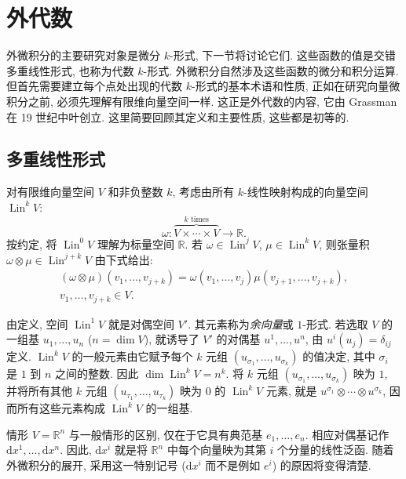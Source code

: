 \section{外代数}\label{sec:exterior-algebra}

外微积分的主要研究对象是微分 $k$-形式, 下一节将讨论它们. 这些函数的值是交错多重线性形式, 也称为代数 $k$-形式. 外微积分自然涉及这些函数的微分和积分运算. 但首先需要建立每个点处出现的代数 $k$-形式的基本术语和性质, 正如在研究向量微积分之前, 必须先理解有限维向量空间一样. 这正是外代数的内容, 它由 Grassman 在 19 世纪中叶创立. 这里简要回顾其定义和主要性质, 这些都是初等的.

\subsection{多重线性形式}\label{subsec:multilinear-forms}

对有限维向量空间 $V$ 和非负整数 $k$, 考虑由所有 $k$-线性映射构成的向量空间 $\operatorname{Lin}^kV$:
\[
\omega:\overbrace{V\times\cdots\times V}^{k\text{ times}}\to\mathbb R.
\]
按约定, 将 $\operatorname{Lin}^0V$ 理解为标量空间 $\mathbb R$. 若 $\omega\in\operatorname{Lin}^jV$, $\mu\in\operatorname{Lin}^kV$, 则张量积 $\omega\otimes\mu\in\operatorname{Lin}^{j+k}V$ 由下式给出:
\[
\begin{gathered}
(\omega\otimes\mu)(v_1,\ldots,v_{j+k})=\omega(v_1,\ldots,v_j)\mu(v_{j+1},\ldots,v_{j+k}),\\
v_1,\ldots,v_{j+k}\in V.
\end{gathered}
\]

由定义, 空间 $\operatorname{Lin}^1V$ 就是对偶空间 $V'$. 其元素称为\emph{余向量}或 $1$-形式. 若选取 $V$ 的一组基 $u_1,\ldots,u_n$ ($n=\dim V$), 就诱导了 $V'$ 的对偶基 $u^1,\ldots,u^n$, 由 $u^i(u_j)=\delta_{ij}$ 定义. $\operatorname{Lin}^kV$ 的一般元素由它赋予每个 $k$ 元组 $(u_{\sigma_1},\ldots,u_{\sigma_k})$ 的值决定, 其中 $\sigma_i$ 是 $1$ 到 $n$ 之间的整数. 因此 $\dim\operatorname{Lin}^kV=n^k$. 将 $k$ 元组 $(u_{\sigma_1},\ldots,u_{\sigma_k})$ 映为 $1$, 并将所有其他 $k$ 元组 $(u_{\tau_1},\ldots,u_{\tau_k})$ 映为 $0$ 的 $\operatorname{Lin}^kV$ 元素, 就是 $u^{\sigma_1}\otimes\cdots\otimes u^{\sigma_k}$, 因而所有这些元素构成 $\operatorname{Lin}^kV$ 的一组基.

情形 $V=\mathbb R^n$ 与一般情形的区别, 仅在于它具有典范基 $e_1,\ldots,e_n$. 相应对偶基记作 $\mathrm{d}x^1,\ldots,\mathrm{d}x^n$. 因此, $\mathrm{d}x^i$ 就是将 $\mathbb R^n$ 中每个向量映为其第 $i$ 个分量的线性泛函. 随着外微积分的展开, 采用这一特别记号 ($\mathrm{d}x^i$ 而不是例如 $e^i$) 的原因将变得清楚.

